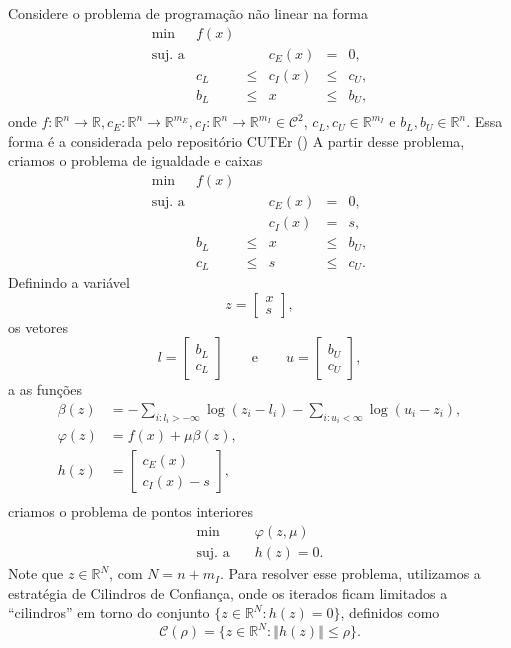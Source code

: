\documentclass[letterpaper,12pt]{article}
\numberwithin{equation}{section}
\newcommand{\visiblelbl}[1]{\label{#1}}
\newcommand{\norma}[1]{\left\Vert{#1}\right\Vert}
\newcommand{\R}{\mathbb{R}}
\newcommand{\Rn}[1]{\mathbb{R}^{#1}}
\newcommand{\vetor}[2]{\left[\begin{array}{c} {#1}\\{#2} \end{array}\right]}
\begin{document}
Considere o problema de programa\c{c}\~{a}o n\~{a}o linear na forma
\begin{equation*}
 \begin{array}{rrrrcll}
  \min & f(x) \\
  \mbox{suj. a} &     &      & c_E(x) &   =  & 0, \\
  & c_L & \leq & c_I(x) & \leq & c_U, \\
  & b_L & \leq &      x & \leq & b_U, \\
  \end{array}
\end{equation*}
onde $f:\Rn{n}\rightarrow\R, c_E:\Rn{n}\rightarrow\Rn{m_E},
c_I:\Rn{n}\rightarrow\Rn{m_I} \in \mathcal{C}^2$, $c_L, c_U \in \Rn{m_I}$ e
$b_L, b_U \in \Rn{n}$.
Essa forma \'{e} a considerada pelo repositório CUTEr (\cite{bib:cuter}) 
A partir desse problema, criamos o problema de igualdade e caixas
\begin{equation*}
 \begin{array}{rrrrcll}
  \min & f(x) \\
  \mbox{suj. a} 
&     &      & c_E(x) &   =  & 0, \\
&     &      & c_I(x) &   =  & s, \\
  & b_L & \leq &      x & \leq & b_U, \\
  & c_L & \leq &s & \leq & c_U.
  \end{array}
\end{equation*}
Definindo a variável
$$z = \vetor{x}{s},$$
os vetores
$$l = \vetor{b_L}{c_L} \qquad \mbox{e} \qquad 
u = \vetor{b_U}{c_U},$$
a as funções
\begin{align*}
\beta(z) & = -\sum_{i : l_i > -\infty} \log(z_i - l_i) -
\sum_{i : u_i < \infty} \log(u_i - z_i), \\
\varphi(z) & = f(x) + \mu \beta(z), \\
h(z) & = \vetor{c_E(x)}{c_I(x) - s}, \\
\end{align*}
criamos o problema de pontos interiores
\begin{equation}\visiblelbl{prob:eq}
  \begin{array}{rl}
\min & \quad \varphi(z,\mu) \\
\mbox{suj. a} & \quad h(z) = 0.
  \end{array}
\end{equation}
Note que $z \in \Rn{N}$, com $N = n+m_I$.
Para resolver esse problema, utilizamos a estrat\'{e}gia 
de Cilindros de Confian\c{c}a, 
onde os iterados
ficam limitados a ``cilindros'' em torno do conjunto 
$\{z \in \Rn{N} : h(z) = 0\}$, definidos como 
$$\mathcal{C}(\rho) = \{z \in \Rn{N} : \norma{h(z)} \leq \rho\}.$$
\end{document}
